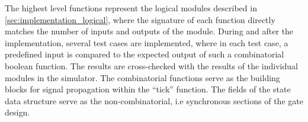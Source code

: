 The highest level functions represent the logical modules described in \autoref{sec:implementation_logical}, where the signature of each function directly matches the number of inputs and outputs of the module. During and after the implementation, several test cases are implemented, where in each test case, a predefined input is compared to the expected output of such a combinatorial boolean function. The results are cross-checked with the results of the individual modules in the simulator. The combinatorial functions serve as the building blocks for signal propagation within the ``tick'' function. The fields of the state data structure serve as the non-combinatorial, i.e synchronous sections of the gate design.

